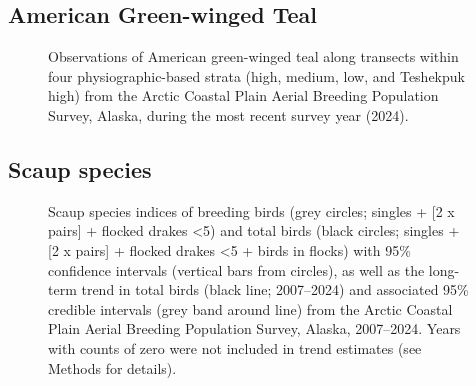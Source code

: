 \documentclass[
]{article}
\begin{document}
\endgroup{}

\newpage{}

\subsection*{American Green-winged
Teal}\label{american-green-winged-teal-2}

\begin{figure}


\caption{\label{fig-GWTEmap}Observations of American green-winged teal
along transects within four physiographic-based strata (high, medium,
low, and Teshekpuk high) from the Arctic Coastal Plain Aerial Breeding
Population Survey, Alaska, during the most recent survey year (2024).}

\end{figure}%

\newpage{}

\subsection*{Scaup species}\label{scaup-species}

\begin{figure}


\caption{\label{fig-UNSC}Scaup species indices of breeding birds (grey
circles; singles + {[}2 x pairs{]} + flocked drakes \textless5) and
total birds (black circles; singles + {[}2 x pairs{]} + flocked drakes
\textless5 + birds in flocks) with 95\% confidence intervals (vertical
bars from circles), as well as the long-term trend in total birds (black
line; 2007--2024) and associated 95\% credible intervals (grey band
around line) from the Arctic Coastal Plain Aerial Breeding Population
Survey, Alaska, 2007--2024. Years with counts of zero were not included
in trend estimates (see Methods for details).}

\end{figure}%

\newpage{}
\end{document}
